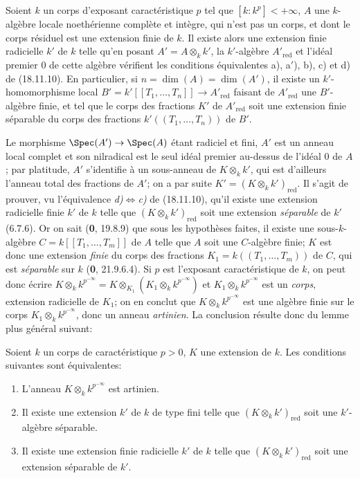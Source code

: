\begin{corollary}[18.11.12]
\label{IV.18.11.12}
Soient $k$ un corps d'exposant caractéristique $p$ tel que $[k:k^p]<+\infty$, $A$ une $k$-algèbre locale noethérienne complète et intègre, qui n'est pas un corps, et dont le corps résiduel est une extension finie de $k$. Il existe alors une extension finie radicielle $k'$ de $k$ telle qu'en posant $A'=A\otimes_k k'$, la $k'$-algèbre $A'_{\mathrm{red}}$ et l'idéal premier $0$ de cette algèbre vérifient les conditions équivalentes \textup{a), a$'$), b), c)} et \textup{d)} de \textup{(18.11.10)}. En particulier, si $n=\dim(A)=\dim(A')$,
il existe un $k'$-homomorphisme local $B'=k'[[T_1,\ldots,T_n]]\to A'_{\mathrm{red}}$ faisant de $A'_{\mathrm{red}}$ une $B'$-algèbre finie, et tel que le corps des fractions $K'$ de $A'_{\mathrm{red}}$ soit une extension finie \textup{séparable} du corps des fractions $k'((T_1,\ldots,T_n))$ de $B'$.
\end{corollary}

Le morphisme $\Spec(A')\to\Spec(A)$ étant radiciel et fini, $A'$ est un anneau local complet et son nilradical est le seul idéal premier au-dessus de l'idéal $0$ de $A$; par platitude, $A'$ s'identifie à un sous-anneau de $K\otimes_k k'$, qui est d'ailleurs l'anneau total des fractions de $A'$; on a par suite $K'=(K\otimes_k k')_{\mathrm{red}}$. Il s'agit de prouver, vu l'équivalence \emph{d)}$\Leftrightarrow$\emph{c)} de (18.11.10), qu'il existe une extension radicielle finie $k'$ de $k$ telle que $(K\otimes_k k')_{\mathrm{red}}$ soit une extension \emph{séparable} de $k'$ (6.7.6). Or on sait (\textbf{0}, 19.8.9) que sous les hypothèses faites, il existe une sous-$k$-algèbre $C=k[[T_1,\ldots,T_m]]$ de $A$ telle que $A$ soit une $C$-algèbre finie; $K$ est donc une extension \emph{finie} du corps des fractions $K_1=k((T_1,\ldots,T_m))$ de $C$, qui est \emph{séparable} sur $k$ (\textbf{0}, 21.9.6.4). Si $p$ est l'exposant caractéristique de $k$, on peut donc écrire $K\otimes_k k^{p^{-\infty}}=K\otimes_{K_1}(K_1\otimes_k k^{p^{-\infty}})$ et $K_1\otimes_k k^{p^{-\infty}}$ est un \emph{corps}, extension radicielle de $K_1$; on en conclut que $K\otimes_k k^{p^{-\infty}}$ est une algèbre finie sur le corps $K_1\otimes_k k^{p^{-\infty}}$, donc un anneau \emph{artinien}. La conclusion résulte donc du lemme plus général suivant:

\begin{lemma}[18.11.12.1]
\label{IV.18.11.12.1}
Soient $k$ un corps de caractéristique $p>0$, $K$ une extension de $k$. Les conditions suivantes sont équivalentes:
\begin{enumerate}
  \item[\textup{a)}] L'anneau $K\otimes_k k^{p^{-\infty}}$ est artinien.
  \item[\textup{b)}] Il existe une extension $k'$ de $k$ de type fini telle que $(K\otimes_k k')_{\mathrm{red}}$ soit une $k'$-algèbre séparable.
  \item[\textup{c)}] Il existe une extension finie radicielle $k'$ de $k$ telle que $(K\otimes_k k')_{\mathrm{red}}$ soit une extension séparable de $k'$.
\end{enumerate}
\end{lemma}

